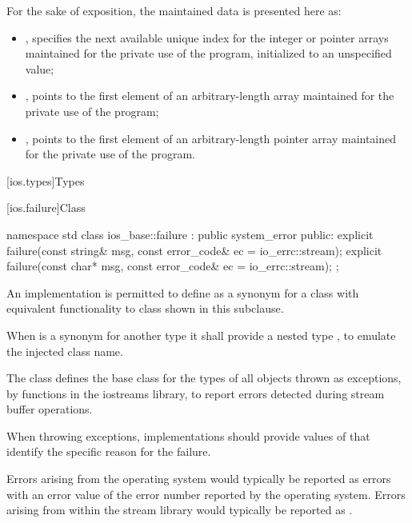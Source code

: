 \pnum
\begin{note}
For the sake of exposition, the maintained data is presented here as:
\begin{itemize}
\item
{},
specifies the next available
unique index for the integer or pointer arrays maintained for the private use
of the program, initialized to an unspecified value;
\item
{},
points to the first element of an
arbitrary-length
array maintained for the private use of the
program;
\item
{},
points to the first element of an
arbitrary-length pointer array maintained for the private use of the program.
\end{itemize}
\end{note}

[ios.types]{Types}

[ios.failure]{Class }

%
%
\begin{codeblock}
namespace std {
  class ios_base::failure : public system_error {
  public:
    explicit failure(const string& msg, const error_code& ec = io_errc::stream);
    explicit failure(const char* msg, const error_code& ec = io_errc::stream);
  };
}
\end{codeblock}

\pnum
An implementation is permitted to define 
as a synonym for a class with equivalent functionality
to class  shown in this subclause.
\begin{note}
When  is a synonym for another type
it shall provide a nested type ,
to emulate the injected class name.
\end{note}
The class
defines the base class
for the types of all objects thrown as exceptions,
by functions in the iostreams library,
to report errors detected during stream buffer operations.

\pnum
When throwing  exceptions, implementations should provide
values of  that identify the specific reason for the failure. \begin{note}
Errors arising from the operating system would typically be reported as
 errors with an error value of the error number
reported by the operating system. Errors arising from within the stream library would
typically be reported as . \end{note}

